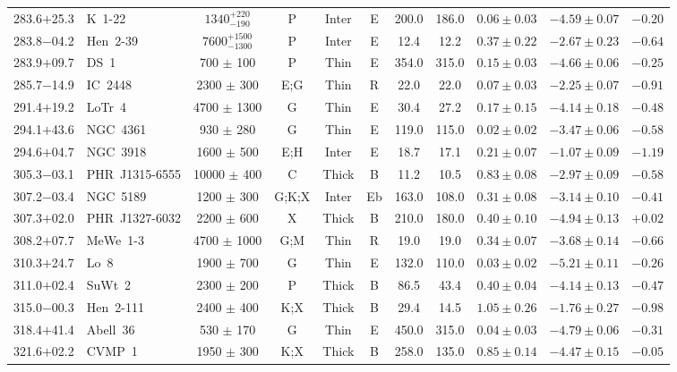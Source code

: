 \documentclass[useAMS]{mn2e}
\begin{document}
\begin{center}
{\begin{longtable}{llccccccccc}
283.6$+$25.3		&	K~1-22	&	$1340^{+220}_{-190}$		&	P		&	Inter		&	E		&	200.0		&	186.0		&	$0.06 \pm 0.03$		&	$-4.59 \pm 0.07$		&	$-0.20$	\\
283.8$-$04.2		&	Hen~2-39	&	$7600^{+1500}_{-1300}$		&	P		&	Inter		&	E		&	12.4		&	12.2		&	$0.37 \pm 0.22$		&	$-2.67 \pm 0.23$		&	$-0.64$	\\
283.9$+$09.7		&	DS~1	&	700	$\pm$	100	&	P		&	Thin		&	E		&	354.0		&	315.0		&	$0.15 \pm 0.03$		&	$-4.66 \pm 0.06$		&	$-0.25$	\\
285.7$-$14.9		&	IC~2448	&	2300	$\pm$	300	&	E;G		&	Thin		&	R		&	22.0		&	22.0		&	$0.07 \pm 0.03$		&	$-2.25 \pm 0.07$		&	$-0.91$	\\
291.4$+$19.2		&	LoTr~4	&	4700	$\pm$	1300	&	G		&	Thin		&	E		&	30.4		&	27.2		&	$0.17 \pm 0.15$		&	$-4.14 \pm 0.18$		&	$-0.48$	\\
294.1$+$43.6		&	NGC~4361	&	930	$\pm$	280	&	G		&	Thin		&	E		&	119.0		&	115.0		&	$0.02 \pm 0.02$		&	$-3.47 \pm 0.06$		&	$-0.58$	\\
294.6$+$04.7		&	NGC~3918	&	1600	$\pm$	500	&	E;H		&	Inter		&	E		&	18.7		&	17.1		&	$0.21 \pm 0.07$		&	$-1.07 \pm 0.09$		&	$-1.19$	\\
305.3$-$03.1		&	PHR~J1315-6555	&	10000	$\pm$	400	&	C		&	Thick		&	B		&	11.2		&	10.5		&	$0.83 \pm 0.08$		&	$-2.97 \pm 0.09$		&	$-0.58$	\\
307.2$-$03.4		&	NGC~5189	&	1200	$\pm$	300	&	G;K;X		&	Inter		&	Eb		&	163.0		&	108.0		&	$0.31 \pm 0.08$		&	$-3.14 \pm 0.10$		&	$-0.41$	\\
307.3$+$02.0		&	PHR~J1327-6032	&	2200	$\pm$	600	&	X		&	Thick		&	B		&	210.0		&	180.0		&	$0.40 \pm 0.10$		&	$-4.94 \pm 0.13$		&	$+0.02$	\\
308.2$+$07.7		&	MeWe~1-3	&	4700	$\pm$	1000	&	G;M		&	Thin		&	R		&	19.0		&	19.0		&	$0.34 \pm 0.07$		&	$-3.68 \pm 0.14$		&	$-0.66$	\\
310.3$+$24.7		&	Lo~8	&	1900	$\pm$	700	&	G		&	Thin		&	E		&	132.0		&	110.0		&	$0.03 \pm 0.02$		&	$-5.21 \pm 0.11$		&	$-0.26$	\\
311.0$+$02.4		&	SuWt~2	&	2300	$\pm$	200	&	P		&	Thick		&	B		&	86.5		&	43.4		&	$0.40 \pm 0.04$		&	$-4.14 \pm 0.13$		&	$-0.47$	\\
315.0$-$00.3		&	Hen~2-111	&	2400	$\pm$	400	&	K;X		&	Thick		&	B		&	29.4		&	14.5		&	$1.05 \pm 0.26$		&	$-1.76 \pm 0.27$		&	$-0.98$	\\
318.4$+$41.4		&	Abell~36	&	530	$\pm$	170	&	G		&	Thin		&	E		&	450.0		&	315.0		&	$0.04 \pm 0.03$		&	$-4.79 \pm 0.06$		&	$-0.31$	\\
321.6$+$02.2		&	CVMP~1	&	1950	$\pm$	300	&	K;X		&	Thick		&	B		&	258.0		&	135.0		&	$0.85 \pm 0.14$		&	$-4.47 \pm 0.15$		&	$-0.05$	\\

\end{longtable}}
\end{center}
\end{document}
